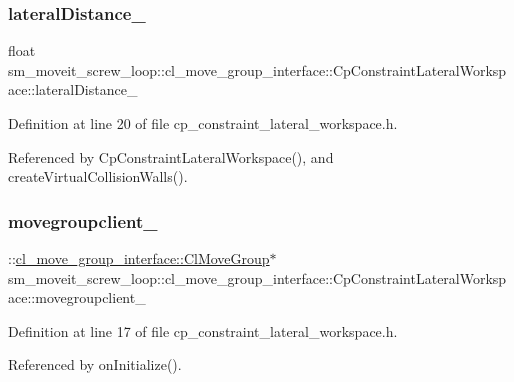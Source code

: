 \subsubsection{\texorpdfstring{lateral\+Distance\+\_\+}{lateralDistance\_}}
{\footnotesize\ttfamily float sm\+\_\+moveit\+\_\+screw\+\_\+loop\+::cl\+\_\+move\+\_\+group\+\_\+interface\+::\+Cp\+Constraint\+Lateral\+Workspace\+::lateral\+Distance\+\_\+\hspace{0.3cm}{\ttfamily [private]}}



Definition at line 20 of file cp\+\_\+constraint\+\_\+lateral\+\_\+workspace.\+h.



Referenced by Cp\+Constraint\+Lateral\+Workspace(), and create\+Virtual\+Collision\+Walls().

\mbox{\label{classsm__moveit__screw__loop_1_1cl__move__group__interface_1_1CpConstraintLateralWorkspace_a28b8261cc21cd75d50979cbbf0f4fd4c}} 
\subsubsection{\texorpdfstring{movegroupclient\+\_\+}{movegroupclient\_}}
{\footnotesize\ttfamily \+::\hyperlink{classcl__move__group__interface_1_1ClMoveGroup}{cl\+\_\+move\+\_\+group\+\_\+interface\+::\+Cl\+Move\+Group}$\ast$ sm\+\_\+moveit\+\_\+screw\+\_\+loop\+::cl\+\_\+move\+\_\+group\+\_\+interface\+::\+Cp\+Constraint\+Lateral\+Workspace\+::movegroupclient\+\_\+\hspace{0.3cm}{\ttfamily [private]}}



Definition at line 17 of file cp\+\_\+constraint\+\_\+lateral\+\_\+workspace.\+h.



Referenced by on\+Initialize().

